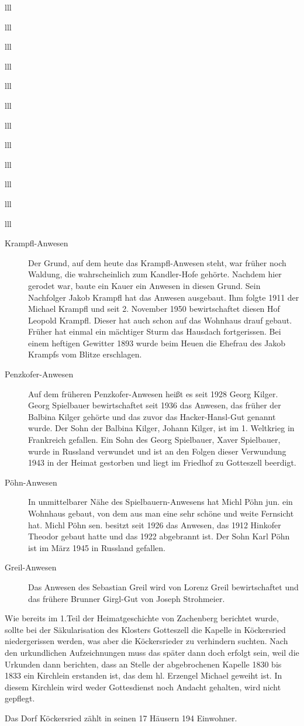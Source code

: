 \documentclass[12pt,a4pager]{book}
\begin{document}
\begin{tabuluar}{lll}
\begin{tabuluar}{lll}
\begin{tabuluar}{lll}
\begin{tabuluar}{lll}
\begin{tabuluar}{lll}
\begin{tabuluar}{lll}
\begin{tabuluar}{lll}
\begin{tabuluar}{lll}
\begin{tabuluar}{lll}
\begin{tabuluar}{lll}
\begin{tabuluar}{lll}
\begin{tabuluar}{lll}
\begin{description}
\item[Krampfl-Anwesen] Der Grund, auf dem heute das Krampfl-Anwesen steht, war
früher noch Waldung, die wahrscheinlich zum Kandler-Hofe gehörte. Nachdem hier
gerodet war, baute ein Kauer ein Anwesen in diesen Grund. Sein Nachfolger Jakob
Krampfl hat das Anwesen ausgebaut. Ihm folgte 1911 der Michael Krampfl und seit
2. November 1950 bewirtschaftet diesen Hof Leopold Krampfl. Dieser hat auch
schon auf das Wohnhaus drauf gebaut. Früher hat einmal ein mächtiger Sturm das
Hausdach fortgerissen. Bei einem heftigen Gewitter 1893 wurde beim Heuen die
Ehefrau des Jakob Krampfs vom Blitze erschlagen.

\item[Penzkofer-Anwesen] Auf dem früheren Penzkofer-Anwesen heißt es seit 1928
Georg Kilger. Georg Spielbauer bewirtschaftet seit 1936 das Anwesen, das früher
der Balbina Kilger gehörte und das zuvor das Hacker-Hansl-Gut genannt wurde. Der
Sohn der Balbina Kilger, Johann Kilger, ist im 1. Weltkrieg in Frankreich
gefallen. Ein Sohn des Georg Spielbauer, Xaver Spielbauer, wurde in Russland
verwundet und ist an den Folgen dieser Verwundung 1943 in der Heimat gestorben
und liegt im Friedhof zu Gotteszell beerdigt.

\item[Pöhn-Anwesen] In unmittelbarer Nähe des Spielbauern-Anwesens hat Michl
Pöhn jun. ein Wohnhaus gebaut, von dem aus man eine sehr schöne und weite
Fernsicht hat. Michl Pöhn sen. besitzt seit 1926 das Anwesen, das 1912 Hinkofer
Theodor gebaut hatte und das 1922 abgebrannt ist. Der Sohn Karl Pöhn ist im März
1945 in Russland gefallen.

\item[Greil-Anwesen] Das Anwesen des Sebastian Greil wird von Lorenz Greil
bewirtschaftet und das frühere Brunner Girgl-Gut von Joseph Strohmeier.
\end{description}

Wie bereits im 1.Teil der Heimatgeschichte von Zachenberg berichtet wurde,
sollte bei der Säkularisation des Klosters Gotteszell die Kapelle in Köckersried
niedergerissen werden, was aber die Köckersrieder zu verhindern suchten. Nach
den urkundlichen Aufzeichnungen muss das später dann doch erfolgt sein, weil die
Urkunden dann berichten, dass an Stelle der abgebrochenen Kapelle 1830 bis 1833
ein Kirchlein erstanden ist, das dem hl. Erzengel Michael geweiht ist. In diesem
Kirchlein wird weder Gottesdienst noch Andacht gehalten, wird nicht gepflegt.

Das Dorf Köckersried zählt in seinen 17 Häusern 194 Einwohner.


\end{tabuluar}
\end{tabuluar}
\end{tabuluar}
\end{tabuluar}
\end{tabuluar}
\end{tabuluar}
\end{tabuluar}
\end{tabuluar}
\end{tabuluar}
\end{tabuluar}
\end{tabuluar}
\end{tabuluar}
\end{document}
